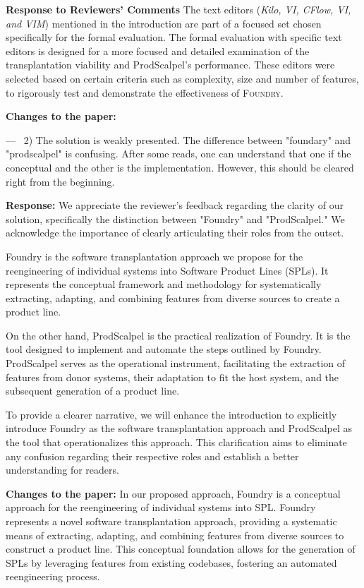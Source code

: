 \documentclass[a4paper,11pt]{letter}
\newcounter{reviewer}
\newcounter{point}[reviewer]
\newcommand{\FOUNDRY}{\textsc{Foundry}\xspace}
\renewcommand{\thepoint}{P\,\thereviewer.\arabic{point}}
\newenvironment{point}
   {\refstepcounter{point} \bigskip \noindent {\textbf{Reviewer~Point~\thepoint} } ---\ }
   {\par }
\newcommand{\response}[1]{\textbf{Response:} \begingroup\color{black}#1\endgroup}
\newcommand{\changes}[1]{\textbf{Changes to the paper:} \begingroup\color{blue}#1\endgroup}
\begin{document}
\begin{letter}{\textbf{Response to Reviewers' Comments}}
{The text editors (\emph{Kilo, VI, CFlow, VI, and VIM}) mentioned in the introduction are part of a focused set chosen specifically for the formal evaluation. The formal evaluation with specific text editors is designed for a more focused and detailed examination of the transplantation viability and ProdScalpel's performance. These editors were selected based on certain criteria such as  complexity, size and number of features, to rigorously test and demonstrate the effectiveness of \FOUNDRY.}

\changes{}

\begin{point} 
2) The solution is weakly presented. The difference between "foundary" and "prodscalpel" is confusing. After some reads, one can understand that one if the conceptual and the other is the implementation. However, this should be cleared right from the beginning. 
\end{point}

\response{We appreciate the reviewer's feedback regarding the clarity of our solution, specifically the distinction between "Foundry" and "ProdScalpel." We acknowledge the importance of clearly articulating their roles from the outset.

Foundry is the software transplantation approach we propose for the reengineering of individual systems into Software Product Lines (SPLs). It represents the conceptual framework and methodology for systematically extracting, adapting, and combining features from diverse sources to create a product line.

On the other hand, ProdScalpel is the practical realization of Foundry. It is the tool designed to implement and automate the steps outlined by Foundry. ProdScalpel serves as the operational instrument, facilitating the extraction of features from donor systems, their adaptation to fit the host system, and the subsequent generation of a product line.

To provide a clearer narrative, we will enhance the introduction to explicitly introduce Foundry as the software transplantation approach and ProdScalpel as the tool that operationalizes this approach. This clarification aims to eliminate any confusion regarding their respective roles and establish a better understanding for readers.}

\changes{In our proposed approach, Foundry is a conceptual approach for the reengineering of individual systems into SPL. Foundry represents a novel software transplantation approach, providing a systematic means of extracting, adapting, and combining features from diverse sources to construct a product line. This conceptual foundation allows for the generation of SPLs by leveraging features from existing codebases, fostering an automated reengineering process.

}
\end{letter}
\end{document}
